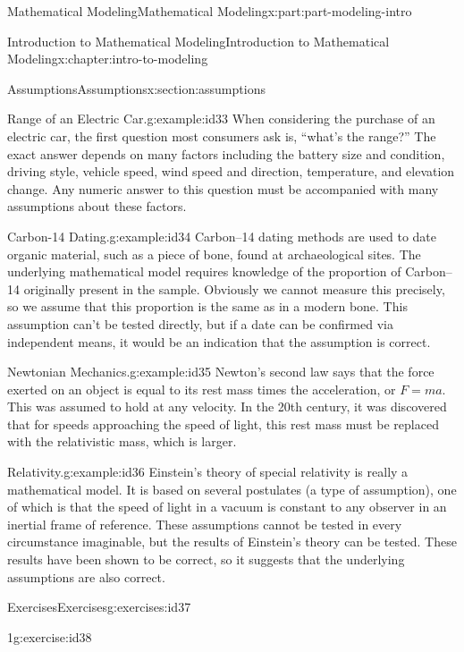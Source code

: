 \documentclass[oneside,10pt,]{book}
\numberwithin{equation}{section}
\begin{document}
\begin{partptx}{Mathematical Modeling}{}{Mathematical Modeling}{}{}{x:part:part-modeling-intro}
\begin{chapterptx}{Introduction to Mathematical Modeling}{}{Introduction to Mathematical Modeling}{}{}{x:chapter:intro-to-modeling}
\begin{sectionptx}{Assumptions}{}{Assumptions}{}{}{x:section:assumptions}
\begin{example}{Range of an Electric Car.}{g:example:id33}%
When considering the purchase of an electric car, the first question most consumers ask is, “what’s the range?” The exact answer depends on many factors including the battery size and condition, driving style, vehicle speed, wind speed and direction, temperature, and elevation change. Any numeric answer to this question must be accompanied with many assumptions about these factors.%
\end{example}
\begin{example}{Carbon-14 Dating.}{g:example:id34}%
Carbon–14 dating methods are used to date organic material, such as a piece of bone, found at archaeological sites. The underlying mathematical model requires knowledge of the proportion of Carbon–14 originally present in the sample. Obviously we cannot measure this precisely, so we assume that this proportion is the same as in a modern bone. This assumption can’t be tested directly, but if a date can be confirmed via independent means, it would be an indication that the assumption is correct.%
\end{example}
\begin{example}{Newtonian Mechanics.}{g:example:id35}%
Newton’s second law says that the force exerted on an object is equal to its rest mass times the acceleration, or \(F = ma\). This was assumed to hold at any velocity. In the 20th century, it was discovered that for speeds approaching the speed of light, this rest mass must be replaced with the relativistic mass, which is larger.%
\end{example}
\begin{example}{Relativity.}{g:example:id36}%
Einstein’s theory of special relativity is really a mathematical model. It is based on several postulates (a type of assumption), one of which is that the speed of light in a vacuum is constant to any observer in an inertial frame of reference. These assumptions cannot be tested in every circumstance imaginable, but the results of Einstein’s theory can be tested. These results have been shown to be correct, so it suggests that the underlying assumptions are also correct.%
\end{example}
%
%
\typeout{************************************************}
\typeout{************************************************}
%
\begin{exercises-subsection-numberless}{Exercises}{}{Exercises}{}{}{g:exercises:id37}
\begin{divisionexercise}{1}{}{}{g:exercise:id38}%

\end{divisionexercise}
\end{exercises-subsection-numberless}
\end{sectionptx}
\end{chapterptx}
\end{partptx}
\end{document}
